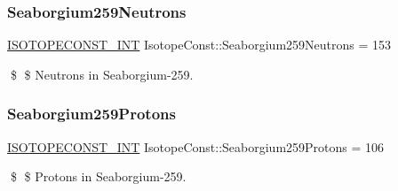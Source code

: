 \subsubsection{\texorpdfstring{Seaborgium259\+Neutrons}{Seaborgium259Neutrons}}
{\footnotesize\ttfamily \mbox{\hyperlink{group___isotope_const-_macros_ga5f18360b3e99483a35c32d789e62621c}{I\+S\+O\+T\+O\+P\+E\+C\+O\+N\+S\+T\+\_\+\+I\+NT}} Isotope\+Const\+::\+Seaborgium259\+Neutrons = 153}

\$ \$ Neutrons in Seaborgium-\/259. \mbox{\label{group___isotope_const-_seaborgium-_sg259_ga521bbaaece1f6fff27df79b2327ca8dc}} 
\subsubsection{\texorpdfstring{Seaborgium259\+Protons}{Seaborgium259Protons}}
{\footnotesize\ttfamily \mbox{\hyperlink{group___isotope_const-_macros_ga5f18360b3e99483a35c32d789e62621c}{I\+S\+O\+T\+O\+P\+E\+C\+O\+N\+S\+T\+\_\+\+I\+NT}} Isotope\+Const\+::\+Seaborgium259\+Protons = 106}

\$ \$ Protons in Seaborgium-\/259. 